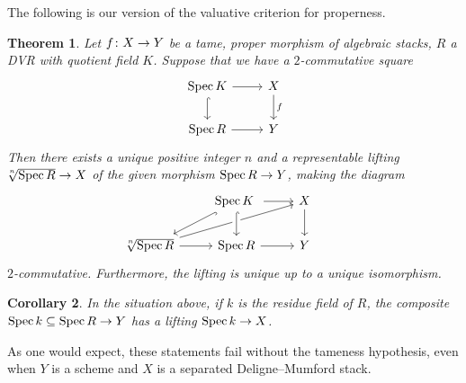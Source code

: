\documentclass{amsart}
\numberwithin{equation}{section}
\numberwithin{subsection}{section}
\newtheorem{theorem}{Theorem}[section]
\newtheorem{corollary}[theorem]{Corollary}
\theoremstyle{definition}
\theoremstyle{remark}
\newcommand\arr{\ifinner\to\else\longrightarrow\fi}
\newcommand\spec{\operatorname{Spec}}
\newcommand\radice[2][\relax]{\hspace{-1.5pt}\sqrt[\uproot{2}#1]{#2}}
\begin{document}
The following is our version of the valuative criterion for properness.

\begin{theorem}\label{thm:valuative}
Let $f\colon X \arr Y$ be a tame, proper morphism of algebraic stacks, $R$ a DVR with quotient field $K$. Suppose that we have a $2$-commutative square
   \[
   \begin{tikzcd}
   \spec K \ar[d, hook]\rar & X \dar{f}\\
   \spec R \rar & Y
   \end{tikzcd}
   \]
Then there exists a unique positive integer $n$ and a representable lifting $\radice[n]{\spec R} \arr X$ of the given morphism $\spec R \arr Y$, making the diagram
	\[\begin{tikzcd}
    &	\spec K\rar\ar[dl, hook]	\	&	X\dar	& 	\\
		\radice[n]{\spec R}\rar\ar[rru]	&	\spec R\rar\ar[from=u,hook,crossing over]	&	Y		& 
	\end{tikzcd}\]
$2$-commutative. Furthermore, the lifting is unique up to a unique isomorphism.
\end{theorem}

\begin{corollary}\label{cor:valuative}
In the situation above, if $k$ is the residue field of $R$, the composite $\spec k \subseteq \spec R \arr Y$ has a lifting $\spec k \arr X$.
\end{corollary}

As one would expect, these statements fail without the tameness hypothesis, even when $Y$ is a scheme and $X$ is a separated Deligne--Mumford stack.
\end{document}
